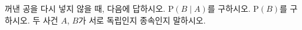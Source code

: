 꺼낸 공을 다시 넣지 않을 때, 다음에 답하시오.
 $\mathrm{P}(B\mid A)$를 구하시오.
 $\mathrm{P}(B)$를 구하시오.
 두 사건 $A$, $B$가 서로 독립인지 종속인지 말하시오.
